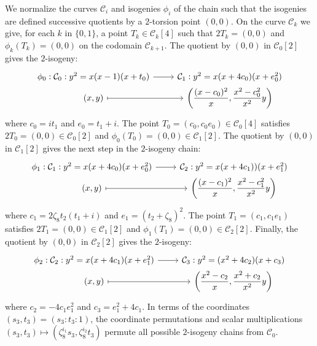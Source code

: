 \documentclass{amsart}
\newcommand{\cC}{\mathcal{C}}
\newcommand{\cY}{\mathcal{Y}}
\newcommand{\dsp}{\displaystyle}
\begin{document}
We normalize the curves $\cC_i$ and isogenies $\phi_i$ of the chain
such that the isogenies are defined successive quotients by a $2$-torsion
point $(0,0)$.  %
On the curve $\cC_k$ we give, for each $k$ in $\{0,1\}$, a point $T_k \in \cC_k[4]$
such that $2T_k = (0,0)$ and $\phi_k(T_k) = (0,0)$ on the codomain $\cC_{k+1}$.
The quotient by $(0,0)$ in $\cC_0[2]$ gives the $2$-isogeny:
$$
\begin{tikzcd}[row sep=0mm]
  \phi_0: \cC_0: y^2 = x(x - 1)(x + t_0) \arrow[r] & \cC_1: y^2 = x(x + 4c_0)(x + e_0^2)\\
  (x,y) \arrow[r,mapsto] & \dsp\left(\frac{(x-c_0)^2}{x}, \frac{x^2-c_0^2}{x^2}y\right)
\end{tikzcd}
$$
where $c_0 = it_1$ and $e_0 = t_1+i$.
The point $T_0 = (c_0,c_0 e_0) \in \cC_0[4]$ satisfies $2T_0 = (0,0) \in \cC_0[2]$
and $\phi_0(T_0) = (0,0) \in \cC_1[2]$.
The quotient by $(0,0)$ in $\cC_1[2]$ gives the next step in the $2$-isogeny chain:
$$
\begin{tikzcd}[row sep=0mm]
  \phi_1: \cC_1: y^2 = x(x + 4c_0)(x + e_0^2) \arrow[r] & \cC_2: y^2 = x(x + 4c_1))(x + e_1^2)\\
  (x,y) \arrow[r,mapsto] & \dsp\left(\frac{(x-c_1)^2}{x}, \frac{x^2-c_1^2}{x^2}y\right)
\end{tikzcd}
$$
where $c_1 = 2\zeta_8t_2(t_1+i)$ and $e_1 = (t_2 + \zeta_8)^2$.
The point $T_1 = (c_1, c_1 e_1)$ satisfies $2T_1 = (0,0) \in \cC_1[2]$ and
$\phi_1(T_1) = (0,0) \in \cC_2[2]$.
Finally, the quotient by $(0,0)$ in $\cC_2[2]$ gives the $2$-isogeny:
$$
\begin{tikzcd}[row sep=0mm]
  \phi_2: \cC_2: y^2 = x(x + 4c_1)(x + e_1^2) \arrow[r] & \cC_3: y^2 = (x^2 + 4c_2)(x + c_3)\\
  (x,y) \arrow[r,mapsto] & \dsp\left(\frac{x^2-c_2}{x}, \frac{x^2+c_2}{x^2}y\right)
\end{tikzcd}
$$
where $c_2 = -4c_1e_1^2$ and $c_3 = e_1^2 + 4c_1$.
In terms of the coordinates $(s_3,t_3) = (s_3:t_3:1)$,
the coordinate permutations and scalar multiplications
$(s_3,t_3) \mapsto (\zeta_8^{i_1} s_3,\zeta_8^{i_2} t_3)$
permute all possible $2$-isogeny chains from $\cC_0$.
\end{document}
